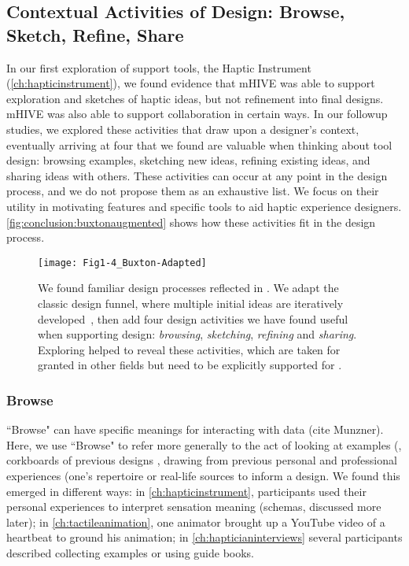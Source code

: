 \subsection{Contextual Activities of Design: Browse, Sketch, Refine, Share}
In our first exploration of \haxd support tools, the Haptic Instrument (\autoref{ch:hapticinstrument}), we found evidence that mHIVE was able to support exploration and sketches of haptic ideas, but not refinement into final designs.
mHIVE was also able to support collaboration in certain ways.
In our followup studies, we explored these activities that draw upon a designer's context, eventually arriving at four that we found are valuable when thinking about tool design: browsing examples, sketching new ideas, refining existing ideas, and sharing ideas with others.
These activities can occur at any point in the design process, and we do not propose them as an exhaustive list.
We focus on their utility in motivating features and specific tools to aid haptic experience designers.
\autoref{fig:conclusion:buxtonaugmented} shows how these activities fit in the design process.


\begin{figure}[htbp] %
   \centering
   \texttt{[image: Fig1-4\_Buxton-Adapted]} 
   \caption{We found familiar design processes reflected in \haxd. We adapt the classic design funnel, where multiple initial ideas are iteratively developed~\cite{Buxton2007}, then add four design activities we have found useful when supporting design: \textit{browsing}, \textit{sketching}, \textit{refining} and \textit{sharing}. Exploring \haxd helped to reveal these activities, which are taken for granted in other fields but need to be explicitly supported for \haxd.}
   \label{fig:conclusion:buxtonaugmented}
\end{figure}


%
%
\subsubsection{Browse} 
``Browse" can have specific meanings for interacting with data (cite Munzner).
Here, we use ``Browse" to refer more generally to the act of looking at examples (\eg, corkboards of previous designs \cite{Buxton2007}, drawing from previous personal and professional experiences (\eg one's repertoire \cite{Schon1982} or real-life sources to inform a design.
We found this emerged in different ways:
in \autoref{ch:hapticinstrument}, participants used their personal experiences to interpret sensation meaning (\ie schemas, discussed more later);
in \autoref{ch:tactileanimation}, one animator brought up a YouTube video of a heartbeat to ground his animation;
in \autoref{ch:hapticianinterviews} several participants described collecting examples or using guide books.

